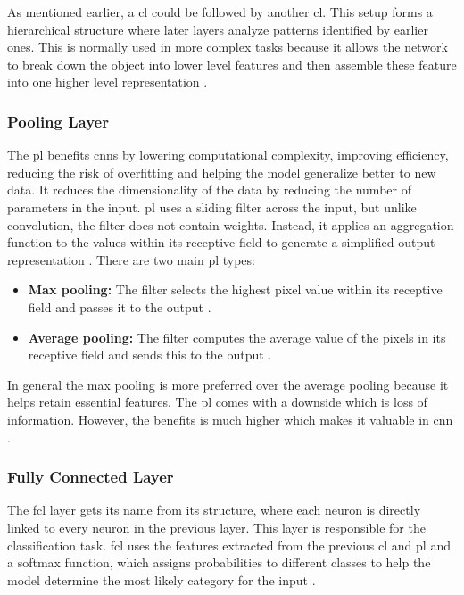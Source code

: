 As mentioned earlier, a \gls{cl} could be followed by another \gls{cl}. This setup forms a hierarchical structure where later layers analyze patterns identified by earlier ones. This is normally used in more complex tasks because it allows the network to break down the object into lower level features and then assemble these feature into one higher level representation \cite{ibm_cnn}.

\subsubsection{Pooling Layer}
The \gls{pl} benefits \gls{cnn}s by lowering computational complexity, improving efficiency, reducing the risk of overfitting and helping the model generalize better to new data. It reduces the dimensionality of the data by reducing the number of parameters in the input. \gls{pl} uses a sliding filter across the input, but unlike convolution, the filter does not contain weights. Instead, it applies an aggregation function to the values within its receptive field to generate a simplified output representation \cite{ibm_cnn}. There are two main \gls{pl} types:

\begin{itemize}
    \item \textbf{Max pooling:} The filter selects the highest pixel value within its receptive field and passes it to the output \cite{ibm_cnn}.
     \item \textbf{Average pooling:} The filter computes the average value of the pixels in its receptive field and sends this to the output \cite{ibm_cnn}.
\end{itemize}

In general the max pooling is more preferred over the average pooling because it helps retain essential features. The \gls{pl} comes with a downside which is loss of information. However, the benefits is much higher which makes it valuable in \gls{cnn} \cite{ibm_cnn}.

\subsubsection{Fully Connected Layer}
The \gls{fcl} layer gets its name from its structure, where each neuron is directly linked to every neuron in the previous layer. This layer is responsible for the classification task. \gls{fcl} uses the features extracted from the previous \gls{cl} and \gls{pl} and a softmax function, which assigns probabilities to different classes to help the model determine the most likely category for the input \cite{ibm_cnn}.



